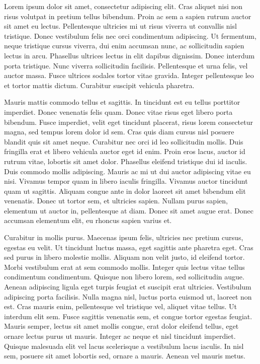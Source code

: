 Lorem ipsum dolor sit amet, consectetur adipiscing elit.
Cras aliquet nisi non risus volutpat in pretium tellus bibendum.
Proin ac sem a sapien rutrum auctor sit amet eu lectus.
Pellentesque ultricies mi ut risus viverra ut convallis nisl tristique.
Donec vestibulum felis nec orci condimentum adipiscing.
Ut fermentum, neque tristique cursus viverra, dui enim accumsan nunc, ac sollicitudin sapien lectus in arcu.
Phasellus ultrices lectus in elit dapibus dignissim.
Donec interdum porta tristique.
Nunc viverra sollicitudin facilisis.
Pellentesque et urna felis, vel auctor massa.
Fusce ultrices sodales tortor vitae gravida.
Integer pellentesque leo et tortor mattis dictum.
Curabitur suscipit vehicula pharetra.

Mauris mattis commodo tellus et sagittis.
In tincidunt est eu tellus porttitor imperdiet.
Donec venenatis felis quam.
Donec vitae risus eget libero porta bibendum.
Fusce imperdiet, velit eget tincidunt placerat, risus lorem consectetur magna, sed tempus lorem dolor id sem.
Cras quis diam cursus nisl posuere blandit quis sit amet neque.
Curabitur nec orci id leo sollicitudin mollis.
Duis fringilla erat et libero vehicula auctor eget id enim.
Proin eros lacus, auctor id rutrum vitae, lobortis sit amet dolor.
Phasellus eleifend tristique dui id iaculis.
Duis commodo mollis adipiscing.
Mauris ac mi ut dui auctor adipiscing vitae eu nisi.
Vivamus tempor quam in libero iaculis fringilla.
Vivamus auctor tincidunt quam ut sagittis.
Aliquam congue ante in dolor laoreet sit amet bibendum elit venenatis.
Donec ut tortor sem, et ultricies sapien.
Nullam purus sapien, elementum ut auctor in, pellentesque at diam.
Donec sit amet augue erat.
Donec accumsan elementum elit, eu rhoncus sapien varius et.

Curabitur in mollis purus.
Maecenas ipsum felis, ultricies nec pretium cursus, egestas eu velit.
Ut tincidunt luctus massa, eget sagittis ante pharetra eget.
Cras sed purus in libero molestie mollis.
Aliquam non velit justo, id eleifend tortor.
Morbi vestibulum erat at sem commodo mollis.
Integer quis lectus vitae tellus condimentum condimentum.
Quisque non libero lorem, sed sollicitudin augue.
Aenean adipiscing ligula eget turpis feugiat et suscipit erat ultricies.
Vestibulum adipiscing porta facilisis.
Nulla magna nisl, luctus porta euismod ut, laoreet non est.
Cras mauris enim, pellentesque vel tristique vel, aliquet vitae tellus.
Ut interdum elit sem.
Fusce sagittis venenatis sem, et congue tortor egestas feugiat.
Mauris semper, lectus sit amet mollis congue, erat dolor eleifend tellus, eget ornare lectus purus ut mauris.
Integer ac neque et nisl tincidunt imperdiet.
Quisque malesuada elit vel lacus scelerisque a vestibulum lacus iaculis.
In nisl sem, posuere sit amet lobortis sed, ornare a mauris.
Aenean vel mauris metus.